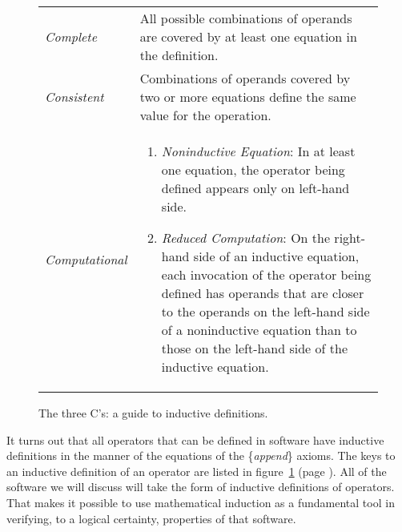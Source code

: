 \begin{figure}
\begin{center}
\begin{tabular}{lp{3.5in}}
\emph{Complete} & All possible combinations of operands are covered by at least one equation in the definition. \\
\emph{Consistent} & Combinations of operands covered by two or more equations define the same value for the operation. \\
\emph{Computational} &
\begin{enumerate}
\item \emph{Noninductive Equation}: In at least one equation,
the operator being defined appears only on left-hand side.
\item \emph{Reduced Computation}:
\index{three C's}\index{definition!inductive (circular)}On the right-hand side of an inductive equation,
each invocation of the operator being defined has operands that
are closer to the operands on the left-hand side of a noninductive equation
than to those on the left-hand side of the inductive equation.
\end{enumerate}
\end{tabular}
\end{center}
\caption{The three C's: a guide to inductive definitions.}
\label{fig:inductive-def-keys}
\end{figure}

It turns out that all operators that can be defined in
software
have inductive definitions in the manner of the equations
of the \{\emph{append}\} axioms.
The keys to an inductive definition of an operator are  listed in
figure~\ref{fig:inductive-def-keys} (page \pageref{fig:inductive-def-keys}).
All of the software we will discuss will take the form of
inductive definitions of operators.
That makes it possible to use mathematical induction as
a fundamental tool in verifying, to a logical certainty,
properties of that software.

